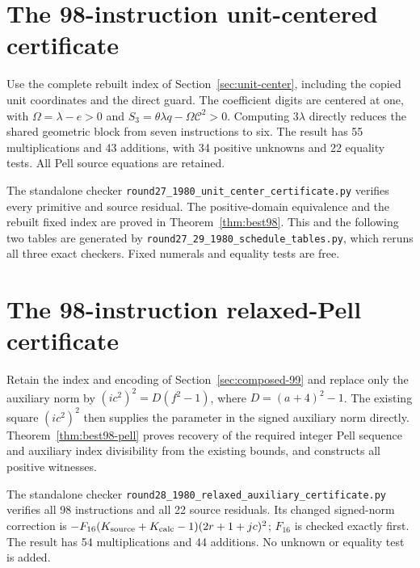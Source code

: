 \documentclass[11pt,letterpaper]{article}
\theoremstyle{definition}
\theoremstyle{remark}
\numberwithin{equation}{section}
\newcommand{\file}[1]{\texttt{#1}}
\begin{document}
\clearpage\normalsize
\section{The 98-instruction unit-centered certificate}\label{app:98-encoding}

Use the complete rebuilt index of Section~\ref{sec:unit-center}, including
the copied unit coordinates and the direct guard. The coefficient digits
are centered at one, with $\Omega=\lambda-e>0$ and
$S_3=\theta\lambda q-\Omega\mathcal C^2>0$. Computing $3\lambda$
directly reduces the shared geometric block from seven instructions to six.
The result has 55 multiplications and 43 additions, with 34 positive
unknowns and 22 equality tests. All Pell source equations are retained.

The standalone checker \file{round27\_1980\_unit\_center\_certificate.py}
verifies every primitive and source residual. The positive-domain
equivalence and the rebuilt fixed index are proved in
Theorem~\ref{thm:best98}. This and the following two tables are generated
by \file{round27\_29\_1980\_schedule\_tables.py}, which reruns all three
exact checkers. Fixed numerals and equality tests are free.

\small


\clearpage\normalsize
\section{The 98-instruction relaxed-Pell certificate}\label{app:98-pell}

Retain the index and encoding of Section~\ref{sec:composed-99} and replace
only the auxiliary norm by $(ic^2)^2=D(f^2-1)$, where $D=(a+4)^2-1$.
The existing square $(ic^2)^2$ then supplies the parameter in the signed
auxiliary norm directly. Theorem~\ref{thm:best98-pell} proves recovery
of the required integer Pell sequence and auxiliary index divisibility
from the existing bounds, and constructs all positive witnesses.

The standalone checker \file{round28\_1980\_relaxed\_auxiliary\_certificate.py}
verifies all 98 instructions and all 22 source residuals. Its changed
signed-norm correction is
$-F_{16}(K_{\rm source}+K_{\rm calc}-1)(2r+1+jc)^2$;
$F_{16}$ is checked exactly first. The result has 54 multiplications
and 44 additions. No unknown or equality test is added.

\small

\end{document}
